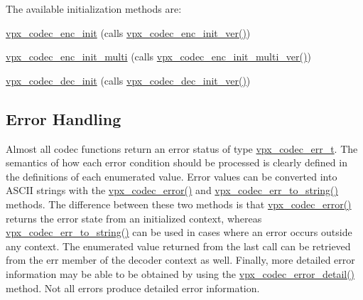 The available initialization methods are\+: \begin{DoxyItemize}
\item \hyperlink{group__encoder_ga3d490a2a9a6acd7c9ef82a603155f3cf}{vpx\+\_\+codec\+\_\+enc\+\_\+init} (calls \hyperlink{group__encoder_ga1472ec347010fe5ef32766a299e57cc4}{vpx\+\_\+codec\+\_\+enc\+\_\+init\+\_\+ver()}) \item \hyperlink{group__encoder_gad7ae1d930cf110d6fe70beafeacfd9c7}{vpx\+\_\+codec\+\_\+enc\+\_\+init\+\_\+multi} (calls \hyperlink{group__encoder_ga1c0415984a5469687f53613a5471f53d}{vpx\+\_\+codec\+\_\+enc\+\_\+init\+\_\+multi\+\_\+ver()}) \item \hyperlink{group__decoder_ga8c2f0b12f1bd4927eb3c68b01eab19d3}{vpx\+\_\+codec\+\_\+dec\+\_\+init} (calls \hyperlink{group__decoder_ga6435c3e8cb9408f1c0c3d052a3a577b7}{vpx\+\_\+codec\+\_\+dec\+\_\+init\+\_\+ver()})\end{DoxyItemize}
\hypertarget{usage_usage_errors}{}\subsection{Error Handling}\label{usage_usage_errors}
Almost all codec functions return an error status of type \hyperlink{group__codec_gada1084710837ad363b92f2379dd2b8d2}{vpx\+\_\+codec\+\_\+err\+\_\+t}. The semantics of how each error condition should be processed is clearly defined in the definitions of each enumerated value. Error values can be converted into A\+S\+C\+II strings with the \hyperlink{group__codec_ga4d265df00d42b36a4f0e3eb83fc22c5e}{vpx\+\_\+codec\+\_\+error()} and \hyperlink{group__codec_gaaddf5c1f609ef18c7c8800d102fcefa6}{vpx\+\_\+codec\+\_\+err\+\_\+to\+\_\+string()} methods. The difference between these two methods is that \hyperlink{group__codec_ga4d265df00d42b36a4f0e3eb83fc22c5e}{vpx\+\_\+codec\+\_\+error()} returns the error state from an initialized context, whereas \hyperlink{group__codec_gaaddf5c1f609ef18c7c8800d102fcefa6}{vpx\+\_\+codec\+\_\+err\+\_\+to\+\_\+string()} can be used in cases where an error occurs outside any context. The enumerated value returned from the last call can be retrieved from the {\ttfamily err} member of the decoder context as well. Finally, more detailed error information may be able to be obtained by using the \hyperlink{group__codec_ga29273cb552ed1a437fe263c4a0a54300}{vpx\+\_\+codec\+\_\+error\+\_\+detail()} method. Not all errors produce detailed error information.

